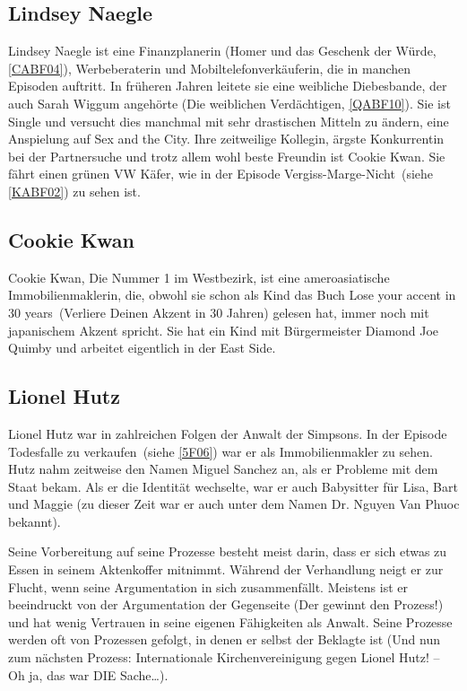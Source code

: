 {\subsection{Lindsey Naegle}\label{LindseyNaegle}
Lindsey Naegle ist eine Finanzplanerin (\glqq Homer und das Geschenk der Würde\grqq, \ref{CABF04}), Werbeberaterin und Mobiltelefon\-ver\-käuf\-er\-in, die in manchen Episoden auftritt. In früheren Jahren leitete sie eine weibliche Diebesbande, der auch Sarah Wiggum angehörte (\glqq Die weiblichen Verdächtigen\grqq, \ref{QABF10}). Sie ist Single und versucht dies manchmal mit sehr drastischen Mitteln zu ändern, eine Anspielung auf \glqq Sex and the City\grqq . Ihre zeitweilige Kollegin, ärgste Konkurrentin bei der Partnersuche und trotz allem wohl beste Freundin ist Cookie Kwan. Sie fährt einen grünen VW Käfer, wie in der Episode \glqq Vergiss-Marge-Nicht\grqq\ (siehe \ref{KABF02}) zu sehen ist.


\subsection{Cookie Kwan}
Cookie Kwan, \glqq Die Nummer 1 im Westbezirk\grqq , ist eine ameroasiatische Immobilienmaklerin, die, obwohl sie schon als Kind das Buch \glqq Lose your accent in 30 years\grqq\ (Verliere Deinen Akzent in 30 Jahren) gelesen hat, immer noch mit japanischem Akzent spricht. Sie hat ein Kind mit Bürgermeister Diamond Joe Quimby und arbeitet eigentlich in der East Side.


\subsection{Lionel Hutz}\label{LionelHutz}
Lionel Hutz war in zahlreichen Folgen der Anwalt der Simpsons. In der Episode \glqq Todesfalle zu verkaufen\grqq\ (siehe \ref{5F06}) war er als Immobilienmakler zu sehen. Hutz nahm zeitweise den Namen Miguel Sanchez an, als er Probleme mit dem Staat bekam. Als er die Identität wechselte, war er auch Babysitter für Lisa, Bart und Maggie (zu dieser Zeit war er auch unter dem Namen Dr. Nguyen Van Phuoc bekannt).

Seine Vorbereitung auf seine Prozesse besteht meist darin, dass er sich etwas zu Essen in seinem Aktenkoffer mitnimmt. Während der Verhandlung neigt er zur Flucht, wenn seine Argumentation in sich zusammenfällt. Meistens ist er beeindruckt von der Argumentation der Gegenseite (\glqq Der gewinnt den Prozess!\grqq ) und hat wenig Vertrauen in seine eigenen Fähigkeiten als Anwalt. Seine Prozesse werden oft von Prozessen gefolgt, in denen er selbst der Beklagte ist (\glqq Und nun zum nächsten Prozess: Internationale Kirchenvereinigung gegen Lionel Hutz! -- Oh ja, das war DIE Sache\dots \grqq ).

}
